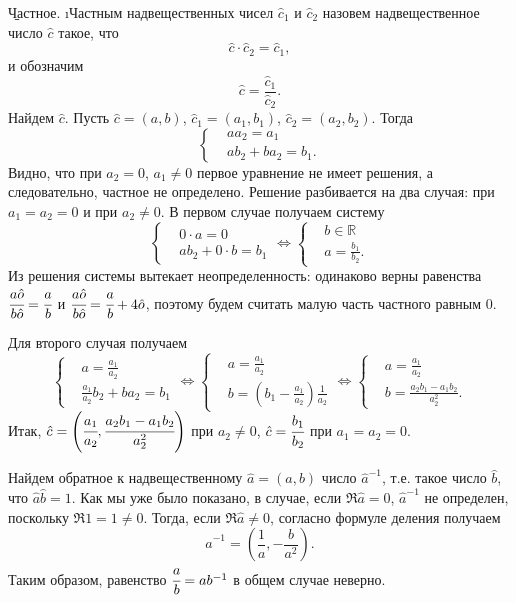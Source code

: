 \b{Частное.} \i{Частным} надвещественных чисел $\hat{c}_1$ и $\hat{c}_2$ назовем надвещественное число $\hat{c}$ такое, что
	$$\hat{c}\cdot\hat{c}_2=\hat{c}_1,$$
и обозначим 
	$$\hat{c}=\frac{\hat{c}_1}{\hat{c}_2}.$$
Найдем $\hat{c}$. Пусть $\hat{c}=(a, b)$, $\hat{c}_1=(a_1, b_1)$, $\hat{c}_2=(a_2, b_2)$. Тогда
	$$\left\{
			\begin{aligned}
				& aa_2=a_1 \\
				& ab_2+ba_2=b_1.
			\end{aligned}
		\right.
	$$
Видно, что при $a_2=0$, $a_1\neq 0$ первое уравнение не имеет решения, а следовательно, частное не определено. Решение разбивается на два случая: при $a_1=a_2=0$ и при $a_2\neq 0$. В первом случае получаем систему
	$$\left\{
			\begin{aligned}
				& 0\cdot a=0 \\
				& ab_2+0\cdot b=b_1
			\end{aligned}
		\right.
		\Leftrightarrow
		\left\{
			\begin{aligned}
				& b\in \mathbb{R} \\
				& a=\frac{b_1}{b_2}.
			\end{aligned}
		\right.
	$$
Из решения системы вытекает неопределенность: одинаково верны равенства $\cfrac{a\hat{o}}{b\hat{o}}=\cfrac{a}{b}$ и $\cfrac{a\hat{o}}{b\hat{o}}=\cfrac{a}{b}+4\hat{o}$, поэтому будем считать малую часть частного равным $0$.\par
Для второго случая получаем
	$$\left\{
			\begin{aligned}
				& a=\frac{a_1}{a_2} \\
				& \frac{a_1}{a_2}b_2+ba_2=b_1
			\end{aligned}
		\right.
		\Leftrightarrow
		\left\{
			\begin{aligned}
				& a=\frac{a_1}{a_2} \\
				& b=\left(b_1-\frac{a_1}{a_2}\right)\frac{1}{a_2}
			\end{aligned}
		\right.
		\Leftrightarrow
		\left\{
			\begin{aligned}
				& a=\frac{a_1}{a_2} \\
				& b=\frac{a_2b_1-a_1b_2}{a_2^2}.
			\end{aligned}
		\right.
	$$
Итак, $\hat{c}=\left(\cfrac{a_1}{a_2}, \cfrac{a_2b_1-a_1b_2}{a_2^2}\right)$ при $a_2\neq 0$, $\hat{c}=\cfrac{b_1}{b_2}$ при $a_1=a_2=0$.\par
Найдем обратное к надвещественному $\hat{a}=(a, b)$ число $\hat{a}^{-1}$, т.е. такое число $\hat{b}$, что $\hat{a}\hat{b}=1$. Как мы уже было показано, в случае, если $\Re{\hat{a}}=0$, $\hat{a}^{-1}$ не определен, поскольку $\Re{1}=1\neq 0$. Тогда, если $\Re{\hat{a}}\neq 0$, согласно формуле деления получаем
\begin{equation}
	\hat{a}^{-1}=\left(\frac{1}{a}, -\frac{b}{a^2}\right).
\end{equation}
Таким образом, равенство $\cfrac{a}{b}=ab^{-1}$ в общем случае неверно.

